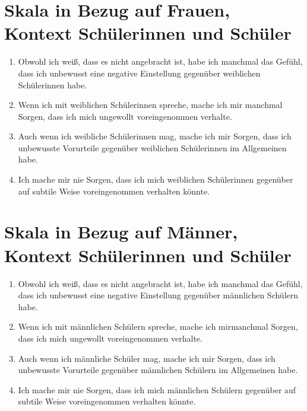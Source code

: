 \section*{Skala in Bezug auf Frauen, Kontext Schülerinnen und Schüler}
\label{app:skala-frauen-sus}

\begin{enumerate}
	\item Obwohl ich weiß, dass es nicht angebracht ist, habe ich manchmal das Gefühl, dass ich unbewusst eine negative Einstellung gegenüber weiblichen Schülerinnen habe.
	
	\item Wenn ich mit weiblichen Schülerinnen spreche, mache ich mir manchmal Sorgen, dass ich mich ungewollt voreingenommen verhalte.
	
	\item Auch wenn ich weibliche Schülerinnen mag, mache ich mir Sorgen, dass ich unbewusste Vorurteile gegenüber weiblichen Schülerinnen im Allgemeinen habe.
	
	\item Ich mache mir nie Sorgen, dass ich mich weiblichen Schülerinnen gegenüber auf subtile Weise voreingenommen verhalten könnte.
\end{enumerate}


\section*{Skala in Bezug auf Männer, Kontext Schülerinnen und Schüler}
\label{app:skala-maenner-sus}

\begin{enumerate}
	\item Obwohl ich weiß, dass es nicht angebracht ist, habe ich manchmal das Gefühl, dass ich unbewusst eine negative Einstellung gegenüber männlichen Schülern habe.
	
	\item Wenn ich mit männlichen Schülern spreche, mache ich mir\break manchmal Sorgen, dass ich mich ungewollt voreingenommen verhalte.
	
	\item Auch wenn ich männliche Schüler mag, mache ich mir Sorgen, dass ich unbewusste Vorurteile gegenüber männlichen Schülern im Allgemeinen habe.
	
	\item Ich mache mir nie Sorgen, dass ich mich männlichen Schülern gegenüber auf subtile Weise voreingenommen verhalten könnte.
\end{enumerate}


